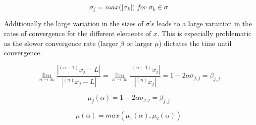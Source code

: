 \documentclass[11pt]{article}
\begin{document}
\[
\sigma_j = max \Big( |\sigma_k| \Big) \; for \; \sigma_k \in \sigma
\]

    Additionally the large variation in the sizes of \(\sigma\)'s leads to a
large varaition in the rates of convergence for the different elements
of \(x\). This is especially problematic as the slower convergence rate
(larger \(\beta\) or larger \(\mu\)) dictates the time until
convergence.

\begin{equation}
\lim_{n \rightarrow \infty} \frac{|^{(n+1)}x_{j} - L|}{|^{(n)}x_{j} - L|} = \lim_{n \rightarrow \infty} \frac{|^{(n+1)}x_{j}|}{|^{(n)}x_{j}|} = 1 - 2 \alpha \sigma_{j,j} = \beta_{j,j}
\end{equation}

    \[
\mu_j(\alpha) = 1 - 2 \alpha \sigma_{j,j} = \beta_{j,j}
\]

\[
\mu(\alpha) = max(\mu_1(\alpha), \mu_2(\alpha))
\]
\end{document}
